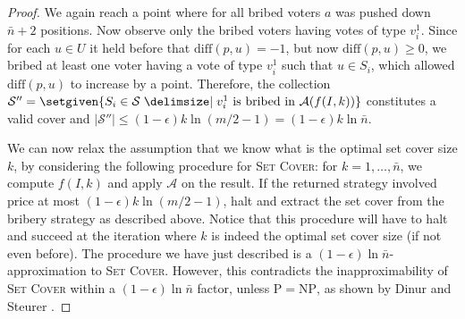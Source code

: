\documentclass[letterpaper]{article} %
\newcommand{\SC}{\textsc{Set Cover}}
\newcommand{\SB}{\textsc{TNC}}
\newcommand{\vcSB}{$\$_{v,c}$-\SB}
\newcommand{\abs}[1]{\lvert{#1}\rvert}
\newcommand{\diff}{\mathrm{diff}}
\newcommand{\NP}{\mathrm{NP}}
\newcommand{\Pclass}{\mathrm{P}}
\begin{document}
\begin{proof}
We again reach a point where for all bribed voters  $a$ was pushed down $\bar{n}+2$ positions. Now observe only the bribed voters having votes of type $v_i^1$. Since  for each $u \in U$ it held before that $\diff(p, u) = -1$, but now $\diff(p, u) \geq 0$, we bribed at least one voter having a vote of type $v_i^1$ such that $u \in S_i$, which allowed $\diff(p, u)$ to increase by a point. Therefore, the collection $\mathcal{S}'' = \setgiven{S_i \in \mathcal{S} \given v_i^1 \text{ is bribed in } \mathcal{A}(f(I,k))}$ constitutes a valid cover and  $\abs{\mathcal{S}''} \leq (1-\epsilon) k \ln (m/2-1) = (1-\epsilon) k \ln \bar{n}$.


We can now relax the assumption that we know what is the optimal set cover size $k$, by considering the following procedure for \SC{}: for $k=1,\ldots,\bar{n}$, we compute $f(I,k)$ and apply  $\mathcal{A}$ on the result. If the returned strategy involved price at most  $ (1-\epsilon) k\ln (m/2-1)$, halt and extract the set cover from the bribery strategy as described above. Notice that this procedure will have to halt and succeed at the iteration where $k$ is indeed the optimal set cover size (if not even before). The procedure we have just described is a  $(1-\epsilon) \ln \bar{n}$-approximation to \SC{}.
However,  this contradicts the inapproximability of \SC{} within a $(1-\epsilon) \ln \bar{n}$ factor, unless $\Pclass = \NP$, as shown by Dinur and Steurer .
\end{proof}


\end{document}

